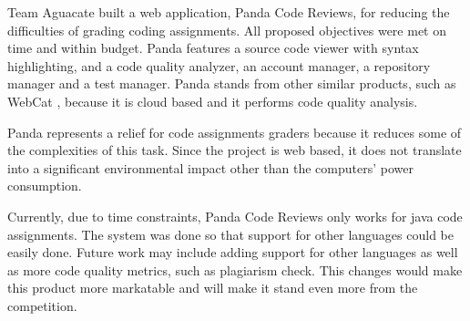 
Team Aguacate built a web application, Panda Code Reviews, for reducing the difficulties of grading coding assignments. All proposed objectives were met on time and within budget. Panda features a source code viewer with syntax highlighting, and a code quality analyzer, an account manager, a repository manager and a test manager. Panda stands from other similar products, such as WebCat \cite{WebCat}, because it is cloud based and it performs code quality analysis.

Panda represents a relief for code assignments graders because it reduces some of the complexities of this task. Since the project is web based, it does not translate into a significant environmental impact other than the computers' power consumption.

Currently, due to time constraints, Panda Code Reviews only works for java code assignments. The system was done so that support for other languages could be easily done. Future work may include adding support for other languages as well as more code quality metrics, such as plagiarism check. This changes would make this product more markatable and will make it stand even more from the competition.
